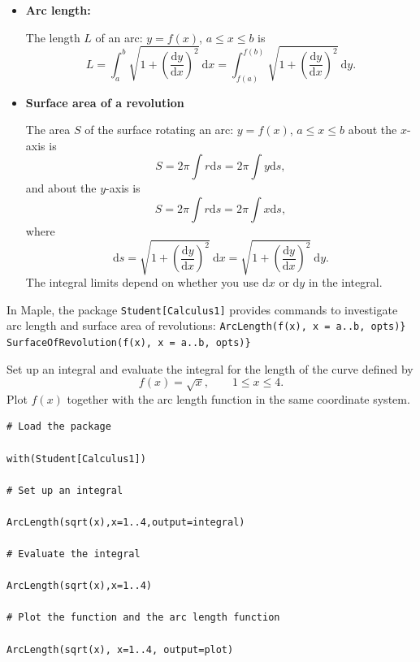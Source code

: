 \documentclass[en,11pt,simple]{elegantbook}
\let\BeginKnitrBlock\begin \let\EndKnitrBlock\end
\begin{document}
\begin{itemize}
\item
  \textbf{Arc length:}

  The length \(L\) of an arc: \(y=f(x)\), \(a\leq x \leq b\) is
  \[
  L=\int_a^b\sqrt{1+\left(\frac{\mathrm{d} y}{\mathrm{d} x}\right)^2}~\mathrm{d} x=\int_{f(a)}^{f(b)}\sqrt{1+\left(\frac{\mathrm{d} y}{\mathrm{d} x}\right)^2}~\mathrm{d} y.
  \]
\item
  \textbf{Surface area of a revolution}

  The area \(S\) of the surface rotating an arc: \(y=f(x)\), \(a\leq x \leq b\) about the \(x\)-axis is
  \[
  S=2\pi\int r\mathrm{d} s = 2\pi\int y\mathrm{d} s,
  \]
  and about the \(y\)-axis is
  \[
  S=2\pi\int r\mathrm{d} s = 2\pi\int x\mathrm{d} s,
  \]
  where
  \[\mathrm{d} s=\sqrt{1+\left(\frac{\mathrm{d} y}{\mathrm{d} x}\right)^2}~\mathrm{d} x = \sqrt{1+\left(\frac{\mathrm{d} y}{\mathrm{d} x}\right)^2}~\mathrm{d} y.
  \]
  The integral limits depend on whether you use \(\mathrm{d} x\) or \(\mathrm{d}y\) in the integral.
\end{itemize}

In Maple, the package \texttt{Student{[}Calculus1{]}} provides commands to investigate arc length and surface area of revolutions:
\texttt{ArcLength(f(x),\ x\ =\ a..b,\ opts)\}}
\texttt{SurfaceOfRevolution(f(x),\ x\ =\ a..b,\ opts)\}}

\BeginKnitrBlock{example}{}{}
\protect\hypertarget{exm:unnamed-chunk-214}{}{\label{exm:unnamed-chunk-214} }
Set up an integral and evaluate the integral for the length of the curve defined by
\[
f(x)=\sqrt{x},\qquad 1\leq x\leq 4.
\]
Plot \(f(x)\) together with the arc length function in the same coordinate system.
\EndKnitrBlock{example}

\BeginKnitrBlock{solution}{}{}
{}

\begin{verbatim}
# Load the package

with(Student[Calculus1])

# Set up an integral

ArcLength(sqrt(x),x=1..4,output=integral)

# Evaluate the integral

ArcLength(sqrt(x),x=1..4)

# Plot the function and the arc length function

ArcLength(sqrt(x), x=1..4, output=plot)
\end{verbatim}
\EndKnitrBlock{solution}
\end{document}
